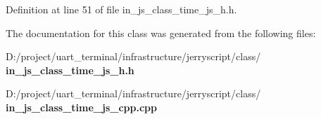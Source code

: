 Definition at line 51 of file in\+\_\+js\+\_\+class\+\_\+time\+\_\+js\+\_\+h.\+h.



The documentation for this class was generated from the following files\+:\begin{DoxyCompactItemize}
\item 
D\+:/project/uart\+\_\+terminal/infrastructure/jerryscript/class/\textbf{ in\+\_\+js\+\_\+class\+\_\+time\+\_\+js\+\_\+h.\+h}\item 
D\+:/project/uart\+\_\+terminal/infrastructure/jerryscript/class/\textbf{ in\+\_\+js\+\_\+class\+\_\+time\+\_\+js\+\_\+cpp.\+cpp}\end{DoxyCompactItemize}
